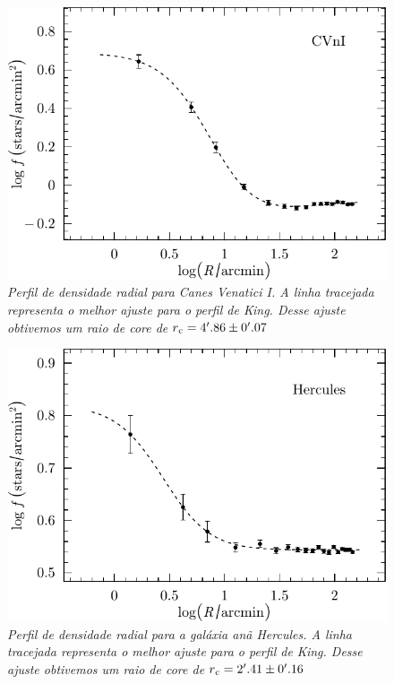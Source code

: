 \documentclass[
	12pt,				%
	openany,			%
	oneside,			%
	a4paper,			%
	english,			%
	brazil				%
	]{abntex2}
\begin{document}
\begin{figure}[H]
\begin{center}
\includegraphics[width=12cm]{figuras/King_profile_CVnI.pdf}
\caption{\textit{Perfil de densidade radial para Canes Venatici I. A linha tracejada representa o melhor ajuste para o perfil de King.  Desse ajuste obtivemos um raio de core de $ r\textsubscript{c} = 4'.86 \pm 0'.07$}}
\label{fig:kingCVnI}
\end{center}
\end{figure}
\vspace{0.5cm}

\begin{figure}[H]
\begin{center}
\includegraphics[width=12cm]{figuras/King_profile_Her.pdf}
\caption{\textit{Perfil de densidade radial para a galáxia anã Hercules. A linha tracejada representa o melhor ajuste para o perfil de King.  Desse ajuste obtivemos um raio de core de $ r\textsubscript{c} = 2'.41 \pm 0'.16$}}
\label{fig:kingHer}
\end{center}
\end{figure}
\vspace{0.5cm}
\end{document}
